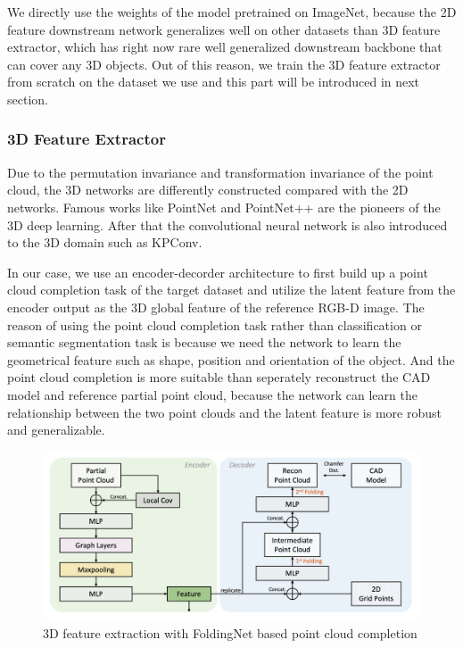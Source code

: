 \documentclass[12pt,DIV14,BCOR12mm,a4paper,footinclude=false,headinclude,parskip=half-,twoside,openright,cleardoublepage=empty,toc=index,bibliography=totoc,listof=totoc]{scrreprt}
\numberwithin{equation}{chapter}
\begin{document}
We directly use the weights of the model pretrained on ImageNet\cite{5206848}, because the 2D feature downstream network generalizes well on other datasets than 3D feature extractor, which has right now rare well generalized downstream backbone that can cover any 3D objects. Out of this reason, we train the 3D feature extractor from scratch on the dataset we use and this part will be introduced in next section.

\subsubsection{3D Feature Extractor}
Due to the permutation invariance and transformation invariance of the point cloud, the 3D networks are differently constructed compared with the 2D networks. Famous works like PointNet\cite{qi2017pointnet} and PointNet++\cite{qi2017pointnet++} are the pioneers of the 3D deep learning. After that the convolutional neural network is also introduced to the 3D domain such as KPConv\cite{thomas2019kpconv}. 

In our case, we use an encoder-decorder architecture to first build up a point cloud completion task of the target dataset and utilize the latent feature from the encoder output as the 3D global feature of the reference RGB-D image. The reason of using the point cloud completion task rather than classification or semantic segmentation task is because we need the network to learn the geometrical feature such as shape, position and orientation of the object. And the point cloud completion is more suitable than seperately reconstruct the CAD model and reference partial point cloud, because the network can learn the relationship between the two point clouds and the latent feature is more robust and generalizable.
\begin{figure}[h]
	\centering
	\includegraphics[scale=.2]{img/fold.png}
	\caption{3D feature extraction with FoldingNet based point cloud completion}
	\label{img:fold}
\end{figure}
\end{document}
